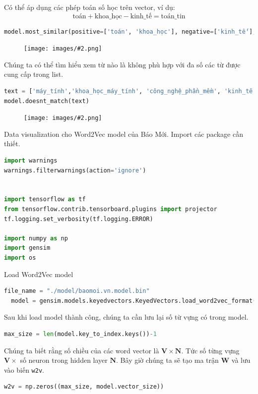 \documentclass[12pt]{article}
\newcommand{\includeImage}[3]{
\begin{figure}[H]
  \centering
  \texttt{[image: images/\#2.png]}
  \def\temp{#3}\ifx\temp\empty\else\caption{#3}\fi
\end{figure}}
\begin{document}
\vskip 0.5cm
\indent Có thể áp dụng các phép toán số học trên vector, ví dụ:
$$\text{toán} + \text{khoa\_học} - \text{kinh\_tế} = \text{toán\_tin}$$

\begin{lstlisting}[language=python]
  model.most_similar(positive=['toán', 'khoa_học'], negative=['kinh_tế'], topn=10)
\end{lstlisting}
\includeImage{1}{26}{}

\vskip 0.5cm
\indent Chúng ta có thể tìm hiểu xem từ nào là không phù hợp với đa số các từ được cung cấp trong list.
\begin{lstlisting}[language=python]
  text = ['máy_tính','khoa_học_máy_tính', 'công_nghệ_phần_mềm', 'kinh_tế', 'đại_số']
model.doesnt_match(text)
\end{lstlisting}
\includeImage{1}{27}{}

\vskip 0.5cm
\indent Data visualization cho Word2Vec model của Báo Mới. Import các package cần thiết.
\begin{lstlisting}[language=python]
import warnings
warnings.filterwarnings(action='ignore')


import tensorflow as tf
from tensorflow.contrib.tensorboard.plugins import projector
tf.logging.set_verbosity(tf.logging.ERROR)

import numpy as np
import gensim
import os
\end{lstlisting}

\vskip 0.5cm
\indent Load Word2Vec model
\begin{lstlisting}[language=python]
  file_name = "./model/baomoi.vn.model.bin"
  model = gensim.models.keyedvectors.KeyedVectors.load_word2vec_format(file_name, binary=True)
\end{lstlisting}

\vskip 0.5cm
\indent Sau khi load model thành công, chúng ta cần lưu lại số từ vựng có trong model.
\begin{lstlisting}[language=python]
  max_size = len(model.key_to_index.keys())-1
\end{lstlisting}

\vskip 0.5cm
\indent Chúng ta biết rằng số chiều của các word vector là $\boldsymbol{V} \times \boldsymbol{N}$. Tức số từng vựng $\boldsymbol{V} \times$ số neuron trong hidden layer $\boldsymbol{N}$. Bây giờ chúng ta sẽ tạo ma trận $\boldsymbol{W}$ và lưu vào biến \texttt{w2v}.
\begin{lstlisting}[language=python]
  w2v = np.zeros((max_size, model.vector_size))
\end{lstlisting}
\end{document}
